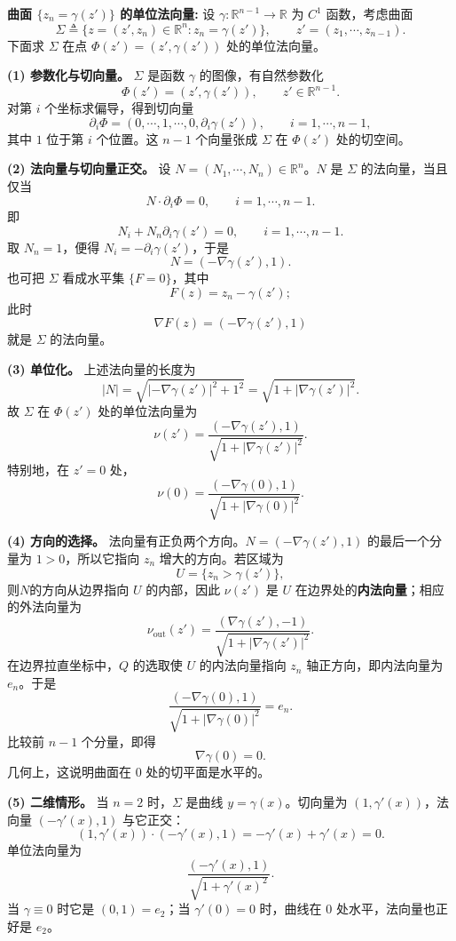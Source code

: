 \documentclass[../../main.tex]{subfiles}
\begin{document}
\begin{remark}
\textbf{曲面 $\{z_n=\gamma(z')\}$ 的单位法向量:}\label{曲面的单位法向量选取}
设 $\gamma:\mathbb{R}^{n-1}\to\mathbb{R}$ 为 $C^1$ 函数，考虑曲面
\[
\Sigma\triangleq\{z=(z',z_n)\in\mathbb{R}^n:z_n=\gamma(z')\},
\qquad z'=(z_1,\cdots,z_{n-1}).
\]
下面求 $\Sigma$ 在点 $\Phi(z')=(z',\gamma(z'))$ 处的单位法向量。

\noindent\textbf{(1) 参数化与切向量。}
$\Sigma$ 是函数 $\gamma$ 的图像，有自然参数化
\[
\Phi(z')=(z',\gamma(z')),\qquad z'\in\mathbb{R}^{n-1}.
\]
对第 $i$ 个坐标求偏导，得到切向量
\[
\partial_i\Phi
=(0,\cdots,1,\cdots,0,\partial_i\gamma(z')),
\qquad i=1,\cdots,n-1,
\]
其中 $1$ 位于第 $i$ 个位置。这 $n-1$ 个向量张成 $\Sigma$ 在 $\Phi(z')$ 处的切空间。

\noindent\textbf{(2) 法向量与切向量正交。}
设 $N=(N_1,\cdots,N_n)\in\mathbb{R}^n$。$N$ 是 $\Sigma$ 的法向量，当且仅当
\[
N\cdot\partial_i\Phi=0,\qquad i=1,\cdots,n-1.
\]
即
\[
N_i+N_n\partial_i\gamma(z')=0,\qquad i=1,\cdots,n-1.
\]
取 $N_n=1$，便得 $N_i=-\partial_i\gamma(z')$，于是
\[
N=(-\nabla\gamma(z'),1).
\]
也可把 $\Sigma$ 看成水平集 $\{F=0\}$，其中
\[
F(z)=z_n-\gamma(z');
\]
此时
\[
\nabla F(z)=(-\nabla\gamma(z'),1)
\]
就是 $\Sigma$ 的法向量。

\noindent\textbf{(3) 单位化。}
上述法向量的长度为
\[
|N|
=\sqrt{|-\nabla\gamma(z')|^2+1^2}
=\sqrt{1+|\nabla\gamma(z')|^2}.
\]
故 $\Sigma$ 在 $\Phi(z')$ 处的单位法向量为
\[
\nu(z')
=\frac{(-\nabla\gamma(z'),1)}{\sqrt{1+|\nabla\gamma(z')|^2}}.
\]
特别地，在 $z'=0$ 处，
\[
\nu(0)
=\frac{(-\nabla\gamma(0),1)}{\sqrt{1+|\nabla\gamma(0)|^2}}.
\]

\noindent\textbf{(4) 方向的选择。}
法向量有正负两个方向。$N=(-\nabla\gamma(z'),1)$ 的最后一个分量为 $1>0$，所以它指向 $z_n$ 增大的方向。若区域为
\[
U=\{z_n>\gamma(z')\},
\]
则$N$的方向从边界指向 $U$ 的内部，因此 $\nu(z')$ 是 $U$ 在边界处的\textbf{内法向量}；相应的外法向量为
\[
\nu_{\mathrm{out}}(z')
=\frac{(\nabla\gamma(z'),-1)}{\sqrt{1+|\nabla\gamma(z')|^2}}.
\]
在边界拉直坐标中，$Q$ 的选取使 $U$ 的内法向量指向 $z_n$ 轴正方向，即内法向量为 $e_n$。于是
\[
\frac{(-\nabla\gamma(0),1)}{\sqrt{1+|\nabla\gamma(0)|^2}}=e_n.
\]
比较前 $n-1$ 个分量，即得
\[
\nabla\gamma(0)=0.
\]
几何上，这说明曲面在 $0$ 处的切平面是水平的。

\noindent\textbf{(5) 二维情形。}
当 $n=2$ 时，$\Sigma$ 是曲线 $y=\gamma(x)$。切向量为 $(1,\gamma'(x))$，法向量 $(-\gamma'(x),1)$ 与它正交：
\[
(1,\gamma'(x))\cdot(-\gamma'(x),1)
=-\gamma'(x)+\gamma'(x)=0.
\]
单位法向量为
\[
\frac{(-\gamma'(x),1)}{\sqrt{1+\gamma'(x)^2}}.
\]
当 $\gamma\equiv0$ 时它是 $(0,1)=e_2$；当 $\gamma'(0)=0$ 时，曲线在 $0$ 处水平，法向量也正好是 $e_2$。
\end{remark}
\end{document}
